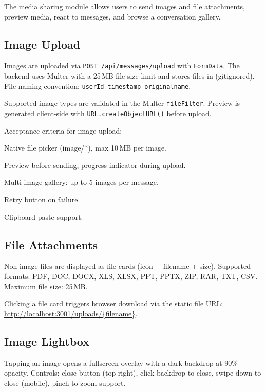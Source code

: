 \documentclass[12pt,a4paper]{article}
\newcommand{\code}[1]{\texttt{#1}}
\newcommand{\file}[1]{\texttt{\detokenize{#1}}}
\begin{document}
The media sharing module allows users to send images and file attachments,
preview media, react to messages, and browse a conversation gallery.

\subsection{Image Upload}
\label{sec:image-upload}

Images are uploaded via \code{POST /api/messages/upload} with \code{FormData}.
The backend uses Multer with a 25\,MB file size limit and stores files in
\file{server/uploads/} (gitignored). File naming convention:
\code{{userId}\_{timestamp}\_{originalname}}.

Supported image types are validated in the Multer \code{fileFilter}.
Preview is generated client-side with \code{URL.createObjectURL()} before upload.

Acceptance criteria for image upload:
\begin{compactitem}
    \item Native file picker (image/*), max 10\,MB per image.
    \item Preview before sending, progress indicator during upload.
    \item Multi-image gallery: up to 5 images per message.
    \item Retry button on failure.
    \item Clipboard paste support.
\end{compactitem}

\subsection{File Attachments}
\label{sec:file-attachments}

Non-image files are displayed as file cards (icon + filename + size).
Supported formats: PDF, DOC, DOCX, XLS, XLSX, PPT, PPTX, ZIP, RAR, TXT, CSV.
Maximum file size: 25\,MB.

Clicking a file card triggers browser download via the static file URL:
\url{http://localhost:3001/uploads/{filename}}.

\subsection{Image Lightbox}
\label{sec:lightbox}

Tapping an image opens a fullscreen overlay with a dark backdrop at 90\% opacity.
Controls: close button (top-right), click backdrop to close,
swipe down to close (mobile), pinch-to-zoom support.
\end{document}
